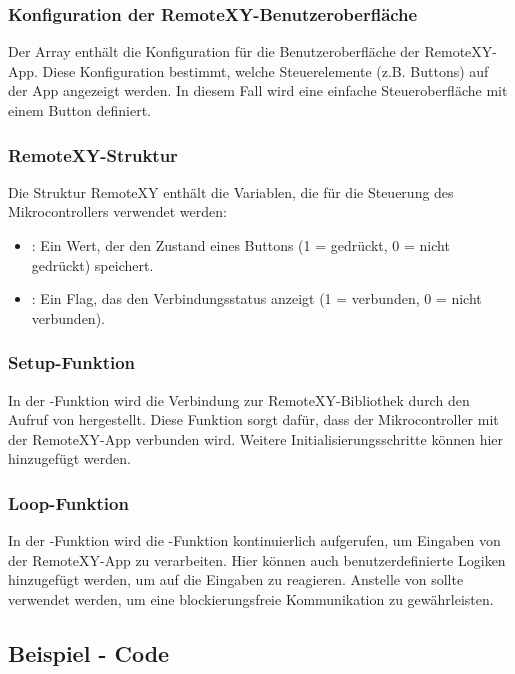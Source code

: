 	\subsubsection{Konfiguration der RemoteXY-Benutzeroberfläche}
	
	Der Array  enthält die Konfiguration für die Benutzeroberfläche der RemoteXY-App. Diese Konfiguration bestimmt, welche Steuerelemente (z.B. Buttons) auf der App angezeigt werden. In diesem Fall wird eine einfache Steueroberfläche mit einem Button definiert.

	\subsubsection{RemoteXY-Struktur}
	
	Die Struktur RemoteXY enthält die Variablen, die für die Steuerung des Mikrocontrollers verwendet werden:
	\begin{itemize}
		\item {}: Ein Wert, der den Zustand eines Buttons (1 = gedrückt, 0 = nicht gedrückt) speichert.
		\item {}: Ein Flag, das den Verbindungsstatus anzeigt (1 = verbunden, 0 = nicht verbunden).
	\end{itemize}

	\subsubsection{Setup-Funktion}
	In der -Funktion wird die Verbindung zur RemoteXY-Bibliothek durch den Aufruf von  hergestellt. Diese Funktion sorgt dafür, dass der Mikrocontroller mit der RemoteXY-App verbunden wird. Weitere Initialisierungsschritte können hier hinzugefügt werden.

	\subsubsection{Loop-Funktion}
	In der -Funktion wird die -Funktion kontinuierlich aufgerufen, um Eingaben von der RemoteXY-App zu verarbeiten. Hier können auch benutzerdefinierte Logiken hinzugefügt werden, um auf die Eingaben zu reagieren. Anstelle von  sollte  verwendet werden, um eine blockierungsfreie Kommunikation zu gewährleisten.



\subsection{Beispiel - Code}

